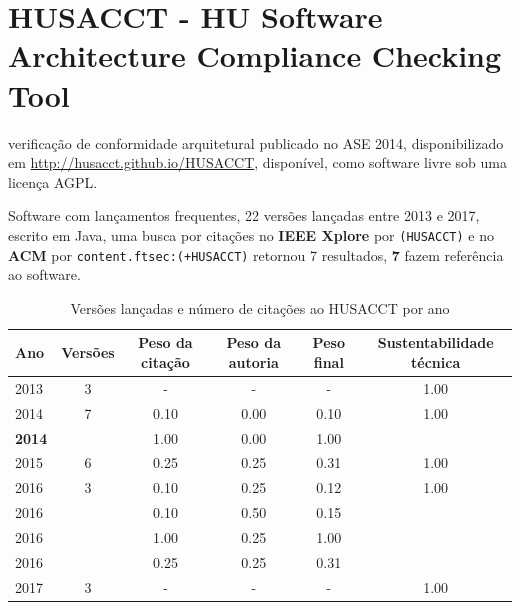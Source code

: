 \section{HUSACCT - HU Software Architecture Compliance Checking Tool}

verificação de conformidade arquitetural
publicado no ASE 2014,
disponibilizado em \url{http://husacct.github.io/HUSACCT},
disponível,
como software livre
sob uma licença AGPL.

Software com lançamentos frequentes,
22 versões lançadas
entre 2013 e 2017,
escrito em Java,
uma busca por citações no {\bf IEEE Xplore} por
\texttt{(HUSACCT)}
e no {\bf ACM} por
\texttt{content.ftsec:(+HUSACCT)}
retornou
7 resultados,
{\bf 7} fazem referência ao software.


\begin{table}[H]
\caption{Versões lançadas e número de citações ao HUSACCT por ano}
\centering
\begin{tabular}{| l | c | c | c | c | c |}
  \hline
  Ano & Versões & Peso da citação & Peso da autoria & Peso final & Sustentabilidade técnica \\
  \hline
        2013 & 3 & - & - & -
        &
          {\color{blue} 1.00}
        \\
\hline
            2014
          &
          7
          &
          0.10
          &
          0.00
          &
          0.10
          &
            {\color{blue} 1.00}
          \\
            {\bf 2014}
          &
          
          &
          1.00
          &
          0.00
          &
          1.00
          &
          \\
\hline
            2015
          &
          6
          &
          0.25
          &
          0.25
          &
          0.31
          &
            {\color{blue} 1.00}
          \\
\hline
            2016
          &
          3
          &
          0.10
          &
          0.25
          &
          0.12
          &
            {\color{blue} 1.00}
          \\
            2016
          &
          
          &
          0.10
          &
          0.50
          &
          0.15
          &
          \\
            2016
          &
          
          &
          1.00
          &
          0.25
          &
          1.00
          &
          \\
            2016
          &
          
          &
          0.25
          &
          0.25
          &
          0.31
          &
          \\
\hline
        2017 & 3 & - & - & -
        &
          {\color{blue} 1.00}
        \\
\hline
\end{tabular}
\end{table}

